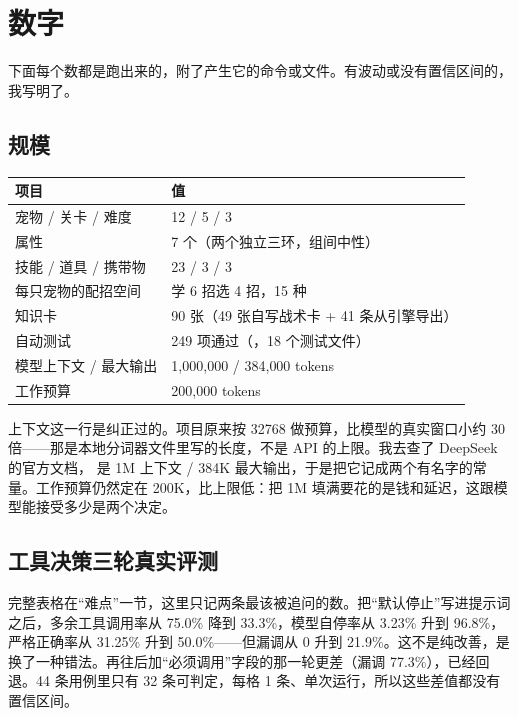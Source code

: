 \section{数字}

下面每个数都是跑出来的，附了产生它的命令或文件。有波动或没有置信区间的，我写明了。

\subsection{规模}

\begin{table}[h]
\centering
\small
\begin{tabular}{L{4.6cm}L{8.9cm}}
\toprule
项目 & 值 \\
\midrule
宠物 / 关卡 / 难度 & 12 / 5 / 3 \\
属性 & 7 个（两个独立三环，组间中性） \\
技能 / 道具 / 携带物 & 23 / 3 / 3 \\
每只宠物的配招空间 & 学 6 招选 4 招，15 种 \\
知识卡 & 90 张（49 张自写战术卡 + 41 条从引擎导出） \\
自动测试 & 249 项通过（，18 个测试文件） \\
模型上下文 / 最大输出 & 1{,}000{,}000 / 384{,}000 tokens \\
工作预算 & 200{,}000 tokens \\
\bottomrule
\end{tabular}
\end{table}

上下文这一行是纠正过的。项目原来按 32768 做预算，比模型的真实窗口小约 30 倍——那是本地分词器文件里写的长度，不是 API 的上限。我去查了 DeepSeek 的官方文档， 是 1M 上下文 / 384K 最大输出，于是把它记成两个有名字的常量。工作预算仍然定在 200K，比上限低：把 1M 填满要花的是钱和延迟，这跟模型能接受多少是两个决定。

\subsection{工具决策三轮真实评测}

完整表格在“难点”一节，这里只记两条最该被追问的数。把“默认停止”写进提示词之后，多余工具调用率从 75.0\% 降到 33.3\%，模型自停率从 3.23\% 升到 96.8\%，严格正确率从 31.25\% 升到 50.0\%——但漏调从 0 升到 21.9\%。这不是纯改善，是换了一种错法。再往后加“必须调用”字段的那一轮更差（漏调 77.3\%），已经回退。44 条用例里只有 32 条可判定，每格 1 条、单次运行，所以这些差值都没有置信区间。


